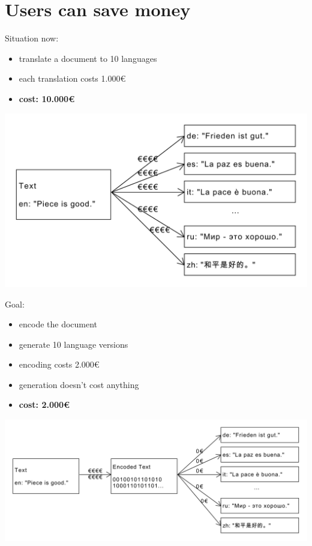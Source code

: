 \documentclass{article}
\begin{document}
\section{Users can save money}

Situation now:
\begin{itemize}
\item translate a document to 10 languages
\item each translation costs 1.000€
\item \textbf{cost: 10.000€}
\end{itemize}

\includegraphics[scale=0.4]{dia/user-view-current-world.pdf}

Goal:
\begin{itemize}
\item encode the document
\item generate 10 language versions
\item encoding costs 2.000€
\item generation doesn't cost anything
\item \textbf{cost: 2.000€}
\end{itemize}

\includegraphics[scale=0.4]{dia/user-view-tokimani.pdf}
\end{document}
